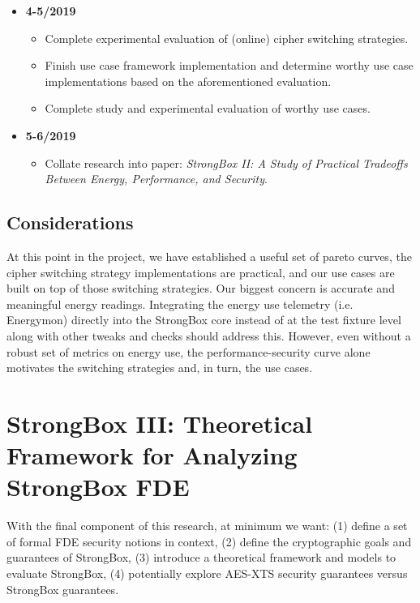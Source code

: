\begin{itemize}
    \item \textbf{4-5/2019}
        \begin{itemize}
            \item Complete experimental evaluation of (online) cipher switching
            strategies.
            \item Finish use case framework implementation and determine worthy
            use case implementations based on the aforementioned evaluation.
            \item Complete study and experimental evaluation of worthy use
            cases.
        \end{itemize}
    \item \textbf{5-6/2019}
        \begin{itemize}
            \item Collate research into paper: \textit{StrongBox II: A Study of
            Practical Tradeoffs Between Energy, Performance, and Security}.
        \end{itemize}
\end{itemize}

\subsection{Considerations}

At this point in the project, we have established a useful set of pareto curves,
the cipher switching strategy implementations are practical, and our use cases
are built on top of those switching strategies. Our biggest concern is accurate
and meaningful energy readings. Integrating the energy use telemetry (i.e.
Energymon) directly into the StrongBox core instead of at the test fixture level
along with other tweaks and checks should address this. However, even without a
robust set of metrics on energy use, the performance-security curve alone
motivates the switching strategies and, in turn, the use cases.

\section{StrongBox III: Theoretical Framework for Analyzing StrongBox FDE}

With the final component of this research, at minimum we want: (1) define a set of
formal FDE security notions in context, (2) define the cryptographic goals and
guarantees of StrongBox, (3) introduce a theoretical framework and models to
evaluate StrongBox, (4) potentially explore AES-XTS security guarantees versus
StrongBox guarantees.

